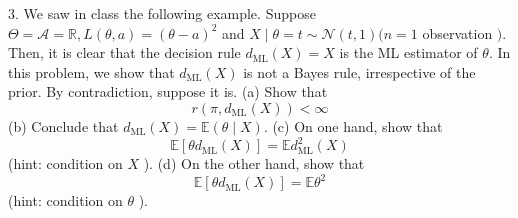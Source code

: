 3. We saw in class the following example. Suppose \(\Theta=\mathcal{A}=\mathbb{R}, L(\theta, a)=(\theta-a)^{2}\) and \(X \mid \theta=t \sim \mathcal{N}(t, 1)(n=1\) observation \() .\) Then, it is clear that the decision rule \(d_{\mathrm{ML}}(X)=X\) is the ML estimator of \(\theta\). In this problem, we show that \(d_{\mathrm{ML}}(X)\) is not a Bayes rule, irrespective of the prior. By contradiction, suppose it is.
(a) Show that
\[
r\left(\pi, d_{\mathrm{ML}}(X)\right)<\infty
\]
(b) Conclude that \(d_{\mathrm{ML}}(X)=\mathbb{E}(\theta \mid X)\).
(c) On one hand, show that
\[
\mathbb{E}\left[\theta d_{\mathrm{ML}}(X)\right]=\mathbb{E} d_{\mathrm{ML}}^{2}(X)
\]
(hint: condition on \(X\) ).
(d) On the other hand, show that
\[
\mathbb{E}\left[\theta d_{\mathrm{ML}}(X)\right]=\mathbb{E} \theta^{2}
\]
(hint: condition on \(\theta\) ).